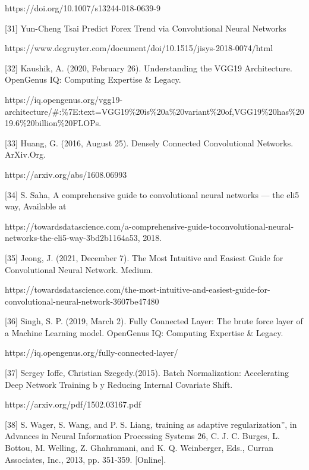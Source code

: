 https://doi.org/10.1007/s13244-018-0639-9

\vspace{5mm}
[31] Yun-Cheng Tsai Predict Forex Trend via Convolutional Neural Networks 

https://www.degruyter.com/document/doi/10.1515/jisys-2018-0074/html

\vspace{5mm}
[32] Kaushik, A. (2020, February 26). Understanding the VGG19 Architecture. OpenGenus IQ: Computing Expertise & Legacy. 

https://iq.opengenus.org/vgg19-architecture/#:\%7E:text=VGG19\%20is\%20a\%20variant\%20of,VGG19\%20has\%2019.6\%20billion\%20FLOPs.

\vspace{5mm}
[33] Huang, G. (2016, August 25). Densely Connected Convolutional Networks. ArXiv.Org. 

https://arxiv.org/abs/1608.06993

\vspace{5mm}
[34] S. Saha, A comprehensive guide to convolutional neural networks — the eli5
way, Available at 

https://towardsdatascience.com/a-comprehensive-guide-toconvolutional-neural-networks-the-eli5-way-3bd2b1164a53, 2018. 

\vspace{5mm}
[35] Jeong, J. (2021, December 7). The Most Intuitive and Easiest Guide for Convolutional Neural Network. Medium. 

https://towardsdatascience.com/the-most-intuitive-and-easiest-guide-for-convolutional-neural-network-3607be47480

\vspace{5mm}
[36] Singh, S. P. (2019, March 2). Fully Connected Layer: The brute force layer of a Machine Learning model. OpenGenus IQ: Computing Expertise & Legacy. 

https://iq.opengenus.org/fully-connected-layer/

\vspace{5mm}
[37] Sergey Ioffe, Christian Szegedy.(2015). Batch Normalization: Accelerating Deep Network Training b y Reducing Internal Covariate Shift. 

https://arxiv.org/pdf/1502.03167.pdf
 
\vspace{5mm} 
[38] S. Wager, S. Wang, and P. S. Liang, training as adaptive regularization”, in Advances in Neural Information Processing Systems 26, C. J. C. Burges, L. Bottou, M. Welling, Z. Ghahramani, and K. Q. Weinberger, Eds., Curran Associates, Inc., 2013, pp. 351-359. [Online].  

